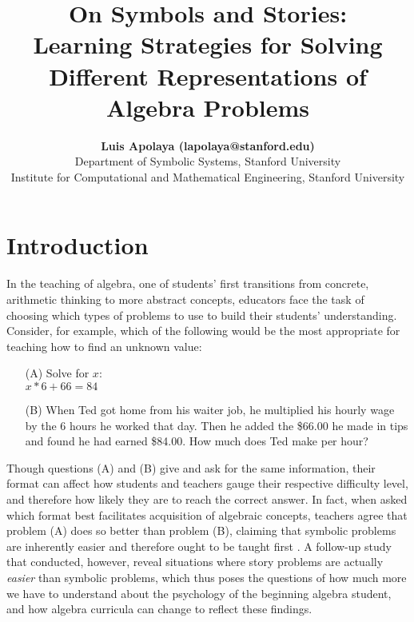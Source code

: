 \documentclass[10pt,letterpaper]{article}
\title{On Symbols and Stories:\\Learning Strategies for Solving Different Representations of Algebra Problems}
\author{{\large \bf Luis Apolaya (lapolaya@stanford.edu)} \\
	Department of Symbolic Systems, Stanford University
	\AND {\large \bf Amy Shoemaker (amyshoe@stanford.edu)} \\
	Institute for Computational and Mathematical Engineering, Stanford University}
\newcommand\TODO[1]{\textcolor{red}{#1}}
\begin{document}
	
	\maketitle
	
	
	
	
	\section{Introduction}
	
	
	In the teaching of algebra, one of students' first transitions from concrete, arithmetic thinking to more abstract concepts, educators face the task of choosing which types of problems to use to build their students' understanding. Consider, for example, which of the following would be the most appropriate for teaching how to find an unknown value:
	
	\begin{enumerate}
		\item[(A)] Solve for $x$:\\ $x * 6 + 66 = 84$
		
		\item[(B)] When Ted got home from his waiter job, he multiplied his hourly wage by the 6 hours he worked that day. Then he added the \$66.00 he made in tips and found he had earned \$84.00. How much does Ted make per hour?
	\end{enumerate}
	
	Though questions (A) and (B) give and ask for the same information, their format can affect how students and teachers gauge their respective difficulty level, and therefore how likely they are to reach the correct answer. In fact, when asked which format best facilitates acquisition of algebraic concepts, teachers agree that problem (A) does so better than problem (B), claiming that symbolic problems are inherently easier and therefore ought to be taught first  \cite{KoedNath2000}. A follow-up study that  conducted, however, reveal situations where story problems are actually \textit{easier} than symbolic problems, which thus poses the questions of how much more we have to understand about the psychology of the beginning algebra student, and how algebra curricula can change to reflect these findings.
	
\end{document}
